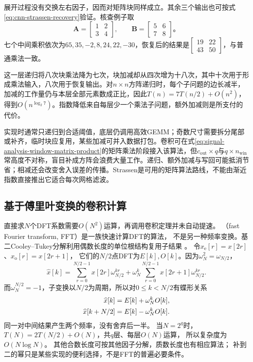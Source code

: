 展开过程没有交换左右因子，因而对矩阵块同样成立。其余三个输出也可按式\eqref{eq:cnn-strassen-recovery}验证。核查例子取
\[
  \bm A=\begin{bmatrix}1&2\\3&4\end{bmatrix},\qquad
  \bm B=\begin{bmatrix}5&6\\7&8\end{bmatrix}\text{。}
\]
七个中间乘积依次为$65,35,-2,8,24,22,-30$，恢复后的结果是$\left[\begin{smallmatrix}19&22\\43&50\end{smallmatrix}\right]$，与普通乘法一致。

这一层递归将八次块乘法降为七次，块加减却从四次增为十八次，其中十次用于形成乘法输入，八次用于恢复输出。对$n\times n$方阵递归时，每个子问题的边长减半，加减的工作量仍与本层全部元素数成正比，因此$T(n)=7T(n/2)+O(n^2)$，得到$O(n^{\log_2 7})$。指数降低来自每层少一个乘法子问题，额外加减则是所支付的代价。

实现时通常只递归到合适阈值，底层仍调用高效GEMM；奇数尺寸需要拆分尾部或补齐，临时块应复用，某些加减可并入数据打包。卷积可在式\eqref{eq:signal-analysis-window-matrix-product}的矩阵乘法阶段接入该算法，但$c_{\mathrm{out}}\times q$与$q\times n_{\mathrm{win}}$常高度不对称，盲目补成方阵会浪费大量工作。递归、额外加减与写回可能抵消节省；相减还会改变舍入误差的传播。Strassen是可用的矩阵算法路线，不能由渐近指数直接推出它适合每次网格滤波。

\subsection{基于傅里叶变换的卷积计算}\label{sec:signal-analysis-fast-fft}\label{sec:cnn-fft}

直接求$N$个DFT系数需要$O(N^2)$运算，再调用卷积定理并未自动提速。
（fast Fourier transform, FFT）是一族快速计算DFT的算法，
不是另一种频率变换。基二Cooley--Tukey分解利用偶数长度的单位根结构复用子结果
。
令$x_{\mathrm e}[r]=x[2r]$、$x_{\mathrm o}[r]=x[2r+1]$，
它们的$N/2$点DFT为$E[k],O[k]$。因为$\omega_N^2=\omega_{N/2}$，
\[
  \widehat x[k]
  =\sum_{r=0}^{N/2-1}x[2r]\omega_{N/2}^{kr}
   +\omega_N^k\sum_{r=0}^{N/2-1}x[2r+1]\omega_{N/2}^{kr}.
\]
而$\omega_N^{N/2}=-1$，子变换以$N/2$为周期，所以对$0\leq k<N/2$有蝶形关系
\begin{align}
  \widehat x[k]&=E[k]+\omega_N^kO[k],\notag\\
  \widehat x[k+N/2]&=E[k]-\omega_N^kO[k].
  \label{eq:signal-analysis-fft-butterfly}
\end{align}
\BookEquationAliases{\label{eq:cnn-fft-butterfly}}
同一对中间结果产生两个频率，没有舍弃后一半。
当$N=2^q$时，$T(N)=2T(N/2)+O(N)$，共$q$层、每层$O(N)$运算，
所以复杂度为$O(N\log N)$。
其他合数长度可按其他因子分解，质数长度也有相应算法；
补到二的幂只是某些实现的便利选择，不是FFT的普遍必要条件。

